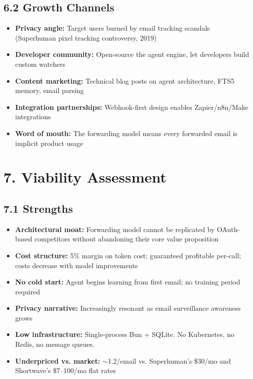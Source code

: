 \documentclass[10pt]{article}
\begin{document}
\subsection*{6.2 Growth Channels}
\begin{itemize}[nosep]
  \item \textbf{Privacy angle:} Target users burned by email tracking scandals (Superhuman pixel tracking controversy, 2019)
  \item \textbf{Developer community:} Open-source the agent engine, let developers build custom watchers
  \item \textbf{Content marketing:} Technical blog posts on agent architecture, FTS5 memory, email parsing
  \item \textbf{Integration partnerships:} Webhook-first design enables Zapier/n8n/Make integrations
  \item \textbf{Word of mouth:} The forwarding model means every forwarded email is implicit product usage
\end{itemize}

\section*{7. Viability Assessment}

\subsection*{7.1 Strengths}
\begin{itemize}[nosep]
  \item \textbf{Architectural moat:} Forwarding model cannot be replicated by OAuth-based competitors without abandoning their core value proposition
  \item \textbf{Cost structure:} 5\% margin on token cost; guaranteed profitable per-call; costs decrease with model improvements
  \item \textbf{No cold start:} Agent begins learning from first email; no training period required
  \item \textbf{Privacy narrative:} Increasingly resonant as email surveillance awareness grows
  \item \textbf{Low infrastructure:} Single-process Bun + SQLite. No Kubernetes, no Redis, no message queues.
  \item \textbf{Underpriced vs. market:} $\sim$1.2\textcent/email vs. Superhuman's \$30/mo and Shortwave's \$7--100/mo flat rates
\end{itemize}
\end{document}
